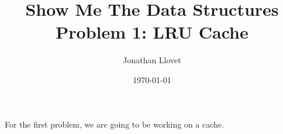 \documentclass{article}
\title{Show Me The Data Structures\\Problem 1: LRU Cache}
\author{Jonathan Llovet}
\date{\today}
\begin{document}
\maketitle

For the first problem, we are going to be working on a cache.
\textcite{DataStructuresAlgorithmsUdacityProblem1LRUCache}

\newpage
\printbibliography
\end{document}
